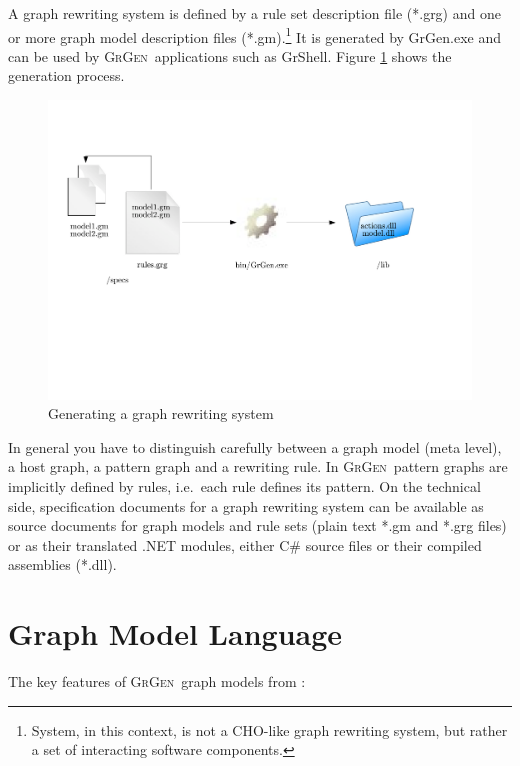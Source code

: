 \documentclass[a4paper,11pt]{report}
\providecommand{\GrG}{{\scshape GrGen}}
\begin{document}
A graph rewriting system is defined by a rule set description file (*.grg) and one or more graph model description files (*.gm).\footnote{System, in this context, is not a CHO-like graph rewriting system, but rather a set of interacting software components.} It is generated by GrGen.exe and can be used by \GrG\ applications such as GrShell. Figure \ref{process} shows the generation process.
\begin{figure}[htbp]
  \centering
  \includegraphics[width=\textwidth]{fig/process}
  \caption{Generating a graph rewriting system}
  \label{process}
\end{figure}

In general you have to distinguish carefully between a graph model (meta level), a host graph, a pattern graph and a rewriting rule. In \GrG\ pattern graphs are implicitly defined by rules, i.e.\ each rule defines its pattern. On the technical side, specification documents for a graph rewriting system can be available as source documents for graph models and rule sets (plain text *.gm and *.grg files) or as their translated .NET modules, either C\# source files or their compiled assemblies (*.dll).

\chapter{Graph Model Language}
The key features of \GrG\ graph models from \cite{geiss}:
\end{document}
